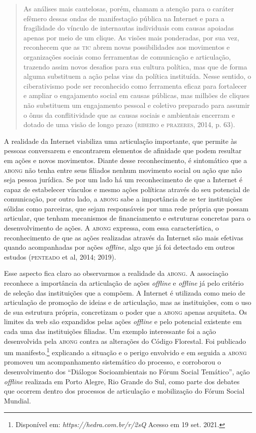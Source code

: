 \begin{quote}
As análises mais cautelosas, porém, chamam a atenção para o caráter
efêmero dessas ondas de manifestação pública na Internet e para a
fragilidade do vínculo de internautas individuais com causas apoiadas
apenas por meio de um clique. As visões mais ponderadas, por sua vez,
reconhecem que as \textsc{tic} abrem novas possibilidades aos movimentos e
organizações sociais como ferramentas de comunicação e articulação,
trazendo assim novos desafios para sua cultura política, mas que de
forma alguma substituem a ação pelas vias da política instituída. Nesse
sentido, o ciberativismo pode ser reconhecido como ferramenta eficaz
para fortalecer e ampliar o engajamento social em causas públicas, mas
milhões de cliques não substituem um engajamento pessoal e coletivo
preparado para assumir o ônus da conflitividade que as causas sociais e
ambientais encerram e dotado de uma visão de longo prazo (\textsc{ribeiro} e
\textsc{prazeres}, 2014, p. 63).
\end{quote}

A realidade da Internet viabiliza uma articulação importante, que
permite às pessoas conversarem e encontrarem elementos de afinidade que
podem resultar em ações e novos movimentos. Diante desse reconhecimento,
é sintomático que a \textsc{abong} não tenha entre seus filiados nenhum movimento
social ou ação que não seja pessoa jurídica. Se por um lado há um
reconhecimento de que a Internet é capaz de estabelecer vínculos e mesmo
ações políticas através do seu potencial de comunicação, por outro lado,
a \textsc{abong} sabe a importância de se ter instituições sólidas como
parceiras, que sejam responsáveis por uma rede própria que possam
articular, que tenham mecanismos de financiamento e estruturas concretas
para o desenvolvimento de ações. A \textsc{abong} expressa, com essa
característica, o reconhecimento de que as ações realizadas através da
Internet são mais efetivas quando acompanhadas por ações \emph{offline}, algo
que já foi detectado em outros estudos (\textsc{penteado} et al, 2014; 2019).

Esse aspecto fica claro ao observarmos a realidade da \textsc{abong}. A
associação reconhece a importância da articulação de ações \emph{offline} e
\emph{offline} já pelo critério de seleção das instituições que a compõem. A
Internet é utilizada como meio de articulação de promoção de ideias e de
articulação, mas as instituições, com o uso de sua estrutura própria,
concretizam o poder que a \textsc{abong} apenas arquiteta. Os limites da web são
expandidos pelas ações \emph{offline} e pelo potencial existente em cada uma
das instituições filiadas. Um exemplo interessante foi a ação
desenvolvida pela \textsc{abong} contra as alterações do Código Florestal. Foi
publicado um manifesto.\footnote{Disponível em:
  \emph{https://hedra.com.br/r/2sQ}
  Acesso em 19 set. 2021.} explicando a situação e o perigo envolvido e em
seguida a \textsc{abong} promoveu um acompanhamento sistemático do processo, e
corroborou o desenvolvimento dos ``Diálogos Socioambientais no Fórum
Social Temático'', ação \emph{offline} realizada em Porto Alegre, Rio Grande
do Sul, como parte dos debates que ocorrem dentro dos processos de
articulação e mobilização do Fórum Social Mundial.

